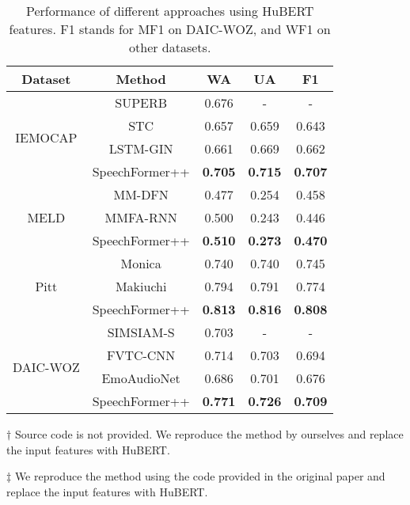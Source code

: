 \documentclass[lettersize,journal]{IEEEtran}
\begin{document}
\begin{table}[t]
    \caption{Performance of different approaches using HuBERT features. F1 stands for MF1 on DAIC-WOZ, and WF1 on other datasets.
    }
    \label{tab_hubert}
    \centering
    \begin{threeparttable}
    \begin{tabular}{c||c||ccc}
    \hline
    Dataset                   & Method  & WA   & UA  & F1   \\ \hline
    \multirow{4}{*}{IEMOCAP}  & SUPERB\cite{superb} & 0.676 & - & -  \\
                              & \tnote{$\dagger$}\; STC\cite{stc} & 0.657	& 0.659	& 0.643  \\
                              & \tnote{$\dagger$}\; LSTM-GIN\cite{LSTM-GIN} & 0.661 & 0.669 & 0.662 \\ \cline{2-5}
                              & SpeechFormer++ & \textbf{0.705} & \textbf{0.715} & \textbf{0.707}  \\ \hline
    \multirow{3}{*}{MELD}     & \tnote{$\ddagger$}\; MM-DFN\cite{MM-DFN}  & 0.477 & 0.254 & 0.458 \\
                              & \tnote{$\dagger$}\; MMFA-RNN\cite{MMFA-RNN} & 0.500 & 0.243 & 0.446\\ \cline{2-5}
                              & SpeechFormer++ & \textbf{0.510} & \textbf{0.273} & \textbf{0.470}  \\ \hline
    \multirow{3}{*}{Pitt}     & Monica\cite{Monica} & 0.740 & 0.740 & 0.745  \\
                              & \tnote{$\dagger$}\; Makiuchi\cite{Makiuchi} & 0.794 & 0.791 & 0.774  \\ \cline{2-5}
                              & SpeechFormer++ & \textbf{0.813} & \textbf{0.816} & \textbf{0.808}  \\ \hline
    \multirow{4}{*}{DAIC-WOZ} & SIMSIAM-S\cite{daic_use_hubert} & 0.703 & - & -  \\
                              & \tnote{$\dagger$}\; FVTC-CNN\cite{FVTC-CNN} & 0.714 & 0.703 & 0.694  \\
                              & \tnote{$\ddagger$}\; EmoAudioNet\cite{EmoAudioNet} & 0.686 & 0.701 & 0.676  \\ \cline{2-5}
                              & SpeechFormer++ & \textbf{0.771} & \textbf{0.726} & \textbf{0.709}  \\ \hline
    \end{tabular}
    \begin{tablenotes}
        \footnotesize
        \item[$\dagger$] Source code is not provided. We reproduce the method by ourselves and replace the input features with HuBERT.
        \item[$\ddagger$] We reproduce the method using the code provided in the original paper and replace the input features with HuBERT.
    \end{tablenotes}
    \end{threeparttable}
\end{table}
\end{document}
